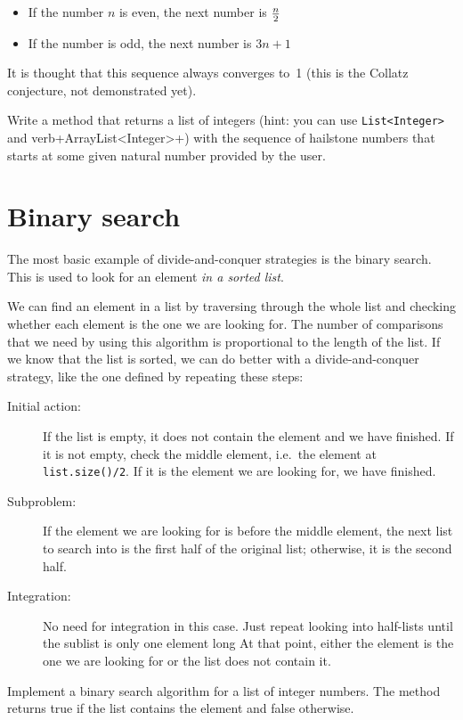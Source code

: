 \documentclass{article}
\begin{document}
\begin{itemize}
\item If the number $n$ is even, the next number is $n \over 2$
\item If the number is odd, the next number is $3n + 1$
\end{itemize}

It is thought that this sequence always converges 
to~1 (this is the Collatz conjecture,
not demonstrated yet). 

Write a method that returns a list of integers
(hint: you can use \verb+List<Integer>+ and verb+ArrayList<Integer>+) 
with the sequence of hailstone numbers that starts at some
given natural number provided by the user. 

\section{Binary search}
\label{sec:binary-search}

The most basic example of divide-and-conquer strategies is the binary
search. This is used to look for an element \emph{in a sorted list}. 

We can find an element in a list by traversing through the whole list
and checking whether each element is the one we are looking for. The
number of comparisons that we need by using this algorithm is
proportional to the length of the list. If we know that the list is
sorted, we can do better with a divide-and-conquer strategy, 
like the one defined by repeating these steps: 

\begin{description}
\item[Initial action: ] If the list is empty, it does not contain the
  element and we have finished. 
  If it is not empty, check the middle element, i.e.~the
  element at \verb+list.size()/2+. If it is the element we are looking
  for, we have finished. 
\item[Subproblem: ] If the element we are looking for is before the
  middle element, the next list to search into is the first half of
  the original list; otherwise, it is the second half.
\item[Integration: ] No need for integration in this case. Just repeat
  looking into half-lists until the sublist is only one element long 
  At that point, either the element is the one we are looking for or
  the list does not contain it. 
\end{description}

Implement a binary search algorithm for a list of integer numbers. The
method returns true if the list contains the element and false
otherwise. 
\end{document}

